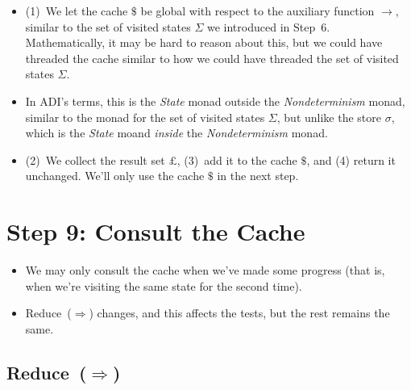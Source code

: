 \documentclass[12pt, oneside]{book}
\begin{document}
\begin{itemize}
  \item (1)~We let the cache \(\$\) be global with respect to the auxiliary function \(→\), similar to the set of visited states \(Σ\) we introduced in Step~6. Mathematically, it may be hard to reason about this, but we could have threaded the cache similar to how we could have threaded the set of visited states \(Σ\).
  \item In ADI’s terms, this is the \emph{State} monad outside the \emph{Nondeterminism} monad, similar to the monad for the set of visited states \(Σ\), but unlike the store \(σ\), which is the \emph{State} moand \emph{inside} the \emph{Nondeterminism} monad.
  \item (2)~We collect the result set \(£\), (3)~add it to the cache \(\$\), and (4) return it unchanged. We’ll only use the cache \(\$\) in the next step.
\end{itemize}

\section{Step 9: Consult the Cache}

\begin{itemize}
  \item We may only consult the cache when we’ve made some progress (that is, when we’re visiting the same state for the second time).
  \item Reduce~(\(⇒\)) changes, and this affects the tests, but the rest remains the same.
\end{itemize}

\subsection{Reduce~(\(⇒\))}
\end{document}
